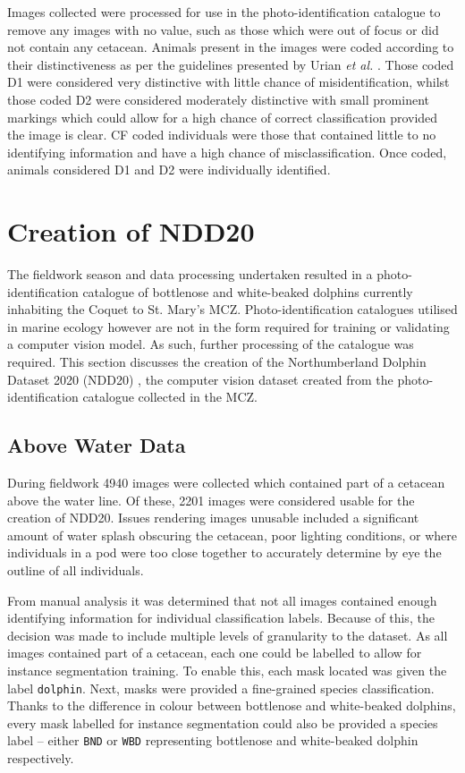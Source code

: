 Images collected were processed for use in the photo-identification catalogue to remove any images with no value, such as those which were out of focus or did not contain any cetacean. Animals present in the images were coded according to their distinctiveness as per the guidelines presented by Urian \textit{et al.} \cite{urian_recommendations_2015}. Those coded D1 were considered very distinctive with little chance of misidentification, whilst those coded D2 were considered moderately distinctive with small prominent markings which could allow for a high chance of correct classification provided the image is clear. CF coded individuals were those that contained little to no identifying information and have a high chance of misclassification. Once coded, animals considered D1 and D2 were individually identified.

\section{Creation of NDD20}\label{ch:datasetCreation,sec:NDD20}

The fieldwork season and data processing undertaken resulted in a photo-identification catalogue of bottlenose and white-beaked dolphins currently inhabiting the Coquet to St. Mary's MCZ. Photo-identification catalogues utilised in marine ecology however are not in the form required for training or validating a computer vision model. As such, further processing of the catalogue was required. This section discusses the creation of the Northumberland Dolphin Dataset 2020 (NDD20) \cite{trotter_ndd20_2020}, the computer vision dataset created from the photo-identification catalogue collected in the MCZ.

\subsection{Above Water Data}\label{ch:datasetCreation,sec:NDD20,sub:aboveWaterData}

During fieldwork 4940 images were collected which contained part of a cetacean above the water line. Of these, 2201 images were considered usable for the creation of NDD20. Issues rendering images unusable included a significant amount of water splash obscuring the cetacean, poor lighting conditions, or where individuals in a pod were too close together to accurately determine by eye the outline of all individuals. 

From manual analysis it was determined that not all images contained enough identifying information for individual classification labels. Because of this, the decision was made to include multiple levels of granularity to the dataset. As all images contained part of a cetacean, each one could be labelled to allow for instance segmentation training. To enable this, each mask located was given the label \texttt{dolphin}. Next, masks were provided a fine-grained species classification. Thanks to the difference in colour between bottlenose and white-beaked dolphins, every mask labelled for instance segmentation could also be provided a species label -- either \texttt{BND} or \texttt{WBD} representing bottlenose and white-beaked dolphin respectively. 

